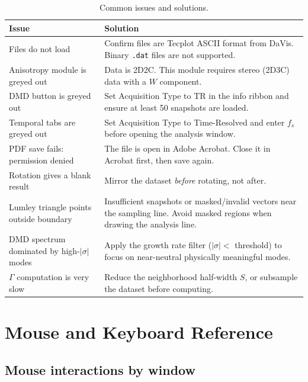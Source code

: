 \documentclass[11pt, a4paper]{report}
\begin{document}
\begin{table}[htbp]
\centering
\caption{Common issues and solutions.}
\begin{tabular}{p{5.2cm}p{8.8cm}}
\toprule
\textbf{Issue} & \textbf{Solution} \\
\midrule
Files do not load & Confirm files are Tecplot ASCII format from DaVis. Binary \texttt{.dat} files are not supported. \\
\addlinespace
Anisotropy module is greyed out & Data is 2D2C. This module requires stereo (2D3C) data with a $W$ component. \\
\addlinespace
DMD button is greyed out & Set Acquisition Type to TR in the info ribbon and ensure at least 50 snapshots are loaded. \\
\addlinespace
Temporal tabs are greyed out & Set Acquisition Type to Time-Resolved and enter $f_s$ before opening the analysis window. \\
\addlinespace
PDF save fails: permission denied & The file is open in Adobe Acrobat. Close it in Acrobat first, then save again. \\
\addlinespace
Rotation gives a blank result & Mirror the dataset \emph{before} rotating, not after. \\
\addlinespace
Lumley triangle points outside boundary & Insufficient snapshots or masked/invalid vectors near the sampling line. Avoid masked regions when drawing the analysis line. \\
\addlinespace
DMD spectrum dominated by high-$|\sigma|$ modes & Apply the growth rate filter ($|\sigma| <$ threshold) to focus on near-neutral physically meaningful modes. \\
\addlinespace
$\Gamma$ computation is very slow & Reduce the neighborhood half-width $S$, or subsample the dataset before computing. \\
\bottomrule
\end{tabular}
\end{table}

\chapter{Mouse and Keyboard Reference}

\section{Mouse interactions by window}
\end{document}
